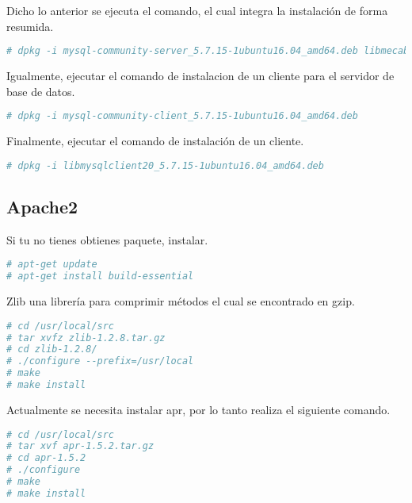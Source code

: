 Dicho lo anterior se ejecuta el comando, el cual integra la instalación de
forma resumida.

\begin{lstlisting}[language=bash, caption={Comando resumido de instalación de servidor de base de datos}]
# dpkg -i mysql-community-server_5.7.15-1ubuntu16.04_amd64.deb libmecab2_0996-1.2ubuntu1_amd64.deb
\end{lstlisting}

Igualmente, ejecutar el comando de instalacion de un cliente para el servidor
de base de datos.

\begin{lstlisting}[language=bash, caption={Comando de instalación de un cliente para el servidor}]
# dpkg -i mysql-community-client_5.7.15-1ubuntu16.04_amd64.deb 
\end{lstlisting}

Finalmente, ejecutar el comando de instalación de un cliente.

\begin{lstlisting}[language=bash, caption={Comando de instalacion de un cliente para el servidor}]
# dpkg -i libmysqlclient20_5.7.15-1ubuntu16.04_amd64.deb
\end{lstlisting}

\subsection{Apache2}

Si tu no tienes obtienes  paquete, instalar.

\begin{lstlisting}[language=bash, caption={Comandos para instalación de paquetes de compilación}]
# apt-get update
# apt-get install build-essential
\end{lstlisting}

Zlib una librería para comprimir métodos el cual se encontrado en gzip.

\begin{lstlisting}[language=bash, caption={Instalación dependencias para servidor web}]
# cd /usr/local/src
# tar xvfz zlib-1.2.8.tar.gz
# cd zlib-1.2.8/
# ./configure --prefix=/usr/local
# make
# make install
\end{lstlisting}

Actualmente se necesita instalar apr, por lo tanto realiza el siguiente
comando.

\begin{lstlisting}[language=bash, caption={Instalacion dependencias para servidor web}]
# cd /usr/local/src
# tar xvf apr-1.5.2.tar.gz
# cd apr-1.5.2
# ./configure
# make
# make install
\end{lstlisting}

